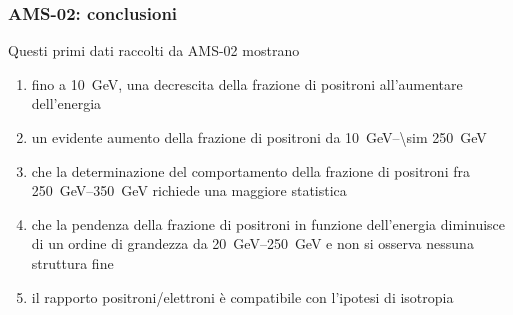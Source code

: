 \documentclass[10pt]{beamer}
\begin{document}
\begin{frame}
  \frametitle{AMS-02: conclusioni}
  Questi primi dati raccolti da AMS-02 mostrano
  \begin{enumerate}[<+->]
  \item fino a \SI{10}{\giga \electronvolt}, una
    \alert{decrescita della frazione di positroni} all'aumentare dell'energia
  \item un evidente \alert{aumento della frazione di positroni} da
    \SIrange[range-phrase={ fino a }]{10}{\sim 250}{\giga \electronvolt}
  \item che la determinazione del comportamento della frazione di positroni fra
    \SIrange[range-phrase={ e }]{250}{350}{\giga \electronvolt} richiede una
    \alert{maggiore statistica}
  \item che la
    \alert{pendenza della frazione di positroni in funzione dell'energia
      diminuisce}
    di un ordine di grandezza da
    \SIrange[range-phrase={ a }]{20}{250}{\giga \electronvolt} e non si osserva
    \alert{nessuna struttura fine}
  \item il rapporto positroni/elettroni è compatibile con l'ipotesi di isotropia
  \end{enumerate}
\end{frame}

\section{\refname}

\begin{frame}
  \frametitle{\refname{}}
  \nocite{*}
  \printbibliography{}
\end{frame}
\end{document}
